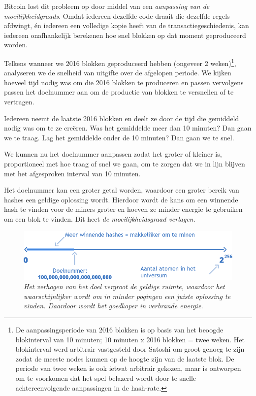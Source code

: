 Bitcoin lost dit probleem op door middel van een \textit{aanpassing van de moeilijkheidgraads}. Omdat iedereen dezelfde code draait die dezelfde regels afdwingt, én iedereen een volledige kopie heeft van de transactiegeschiedenis, kan iedereen onafhankelijk berekenen hoe snel blokken op dat moment geproduceerd worden.

Telkens wanneer we 2016 blokken geproduceerd hebben (ongeveer 2 weken)\footnote{De aanpassingsperiode van 2016 blokken is op basis van het beoogde blokinterval van 10 minuten; 10 minuten x 2016 blokken = twee weken. Het blokinterval werd arbitrair vastgesteld door Satoshi om groot genoeg te zijn zodat de meeste nodes kunnen op de hoogte zijn van de laatste blok. De periode van twee weken is ook ietwat arbitrair gekozen, maar is ontworpen om te voorkomen dat het spel belazerd wordt door te snelle achtereenvolgende aanpassingen in de hash-rate.}, analyseren we de snelheid van uitgifte over de afgelopen periode. We kijken hoeveel tijd nodig was om die 2016 blokken te produceren en passen vervolgens passen het doelnummer aan om de productie van blokken te versnellen of te vertragen.

Iedereen neemt de laatste 2016 blokken en deelt ze door de tijd die gemiddeld nodig was om te ze creëren. Was het gemiddelde meer dan 10 minuten? Dan gaan we te traag. Lag het gemiddelde onder de 10 minuten? Dan gaan we te snel.

We kunnen nu het doelnummer aanpassen zodat het groter of kleiner is, proportioneel met hoe traag of snel we gaan, om te zorgen dat we in lijn blijven met het afgesproken interval van 10 minuten.

Het doelnummer kan een groter getal worden, waardoor een groter bereik van hashes een geldige oplossing wordt. Hierdoor wordt de kans om een winnende hash te vinden voor de miners groter en hoeven ze minder energie te gebruiken om een blok te vinden. Dit heet \textit{de moeilijkheidsgraad verlagen}.

\begin{figure}
    \centering
    \includegraphics[width=\textwidth]{images/fig8.png}
    \caption{\footnotesize{\textit{Het verhogen van het doel vergroot de geldige ruimte, waardoor het waarschijnlijker wordt om in minder pogingen een juiste oplossing te vinden. Daardoor wordt het goedkoper in verbrande \mbox{energie.}}}}
    \label{fig9}
\end{figure}



